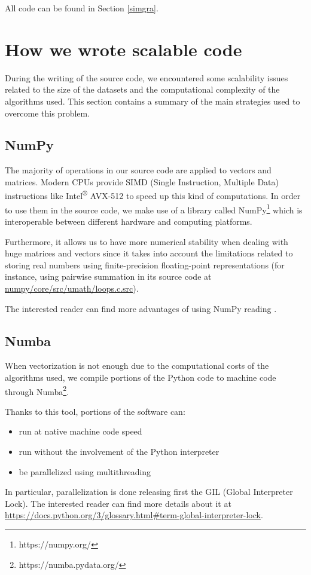 All code can be found in Section \ref{simgra}.

\section{How we wrote scalable code} \label{scaling}
During the writing of the source code, we encountered some scalability issues related to
the size of the datasets and the computational complexity of the algorithms used.
This section contains a summary of the main strategies used to overcome this
problem.

\subsection{NumPy}
The majority of operations in our source code are applied to vectors and matrices.
Modern CPUs provide SIMD (Single Instruction, Multiple Data) instructions like
Intel\textsuperscript{®} AVX-512 to speed up this kind of computations.
In order to use them in the source code, we make use of a library called NumPy\footnote{https://numpy.org/}
which is interoperable between different hardware and computing platforms.

Furthermore, it allows us to have more numerical stability when dealing with huge
matrices and vectors since it takes into account the limitations
related to storing real numbers using finite-precision floating-point representations
(for instance, using pairwise summation in its source code at
\href{https://github.com/numpy/numpy/blob/v1.18.1/numpy/core/src/umath/loops.c.src}{numpy/core/src/umath/loops.c.src}).

The interested reader can find more advantages of using NumPy reading \cite{5725236}.

\subsection{Numba}
When vectorization is not enough due to the computational costs of the algorithms used, we
compile portions of the Python code to machine code through Numba\footnote{https://numba.pydata.org/}.

Thanks to this tool, portions of the software can:
\begin{itemize}
    \item run at native machine code speed
    \item run without the involvement of the Python interpreter
    \item be parallelized using multithreading
\end{itemize}
In particular, parallelization is done releasing first the GIL (Global Interpreter Lock).
The interested reader can find more details about it
at \url{https://docs.python.org/3/glossary.html\#term-global-interpreter-lock}.


